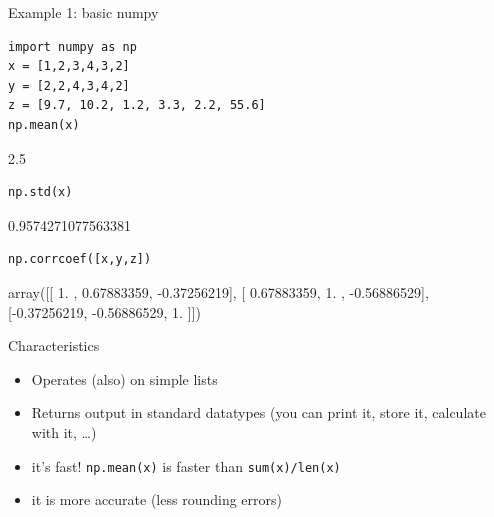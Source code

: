 \documentclass{beamer}
\begin{document}
\begin{frame}[fragile]{Example 1: basic numpy}
\begin{lstlisting}
import numpy as np
x = [1,2,3,4,3,2]
y = [2,2,4,3,4,2]
z = [9.7, 10.2, 1.2, 3.3, 2.2, 55.6]
np.mean(x)
\end{lstlisting}
\begin{lstlistingoutput}
2.5
\end{lstlistingoutput}
\begin{lstlisting}
np.std(x)
\end{lstlisting}
\begin{lstlistingoutput}
0.9574271077563381
\end{lstlistingoutput}

\begin{lstlisting}
np.corrcoef([x,y,z])
\end{lstlisting}

\begin{lstlistingoutput}
array([[ 1.        ,  0.67883359, -0.37256219],
       [ 0.67883359,  1.        , -0.56886529],
       [-0.37256219, -0.56886529,  1.        ]])
\end{lstlistingoutput}

\end{frame}

\begin{frame}{Characteristics}
\begin{itemize}
	\item Operates (also) on simple lists
	\item Returns output in standard datatypes (you can print it, store it, calculate with it, \ldots)
	\item it's fast! \texttt{np.mean(x)} is faster than \texttt{sum(x)/len(x)}
	\item it is more accurate (less rounding errors) 
\end{itemize}
\end{frame}
\end{document}
